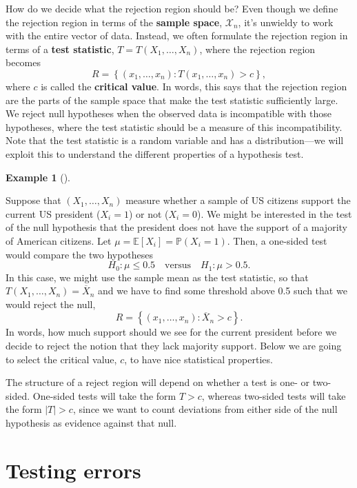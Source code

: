 \documentclass[
  letterpaper,
  DIV=11,
  numbers=noendperiod]{scrreprt}
\newcommand{\E}{\mathbb{E}}
\renewcommand{\P}{\mathbb{P}}
\newcommand{\Xbar}{\overline{X}}
\theoremstyle{definition}
\theoremstyle{plain}
\theoremstyle{definition}
\newtheorem{example}{Example}[chapter]
\theoremstyle{remark}
\begin{document}
How do we decide what the rejection region should be? Even though we
define the rejection region in terms of the \textbf{sample space},
\(\mathcal{X}_n\), it's unwieldy to work with the entire vector of data.
Instead, we often formulate the rejection region in terms of a
\textbf{test statistic}, \(T = T(X_1, \ldots, X_n)\), where the
rejection region becomes \[
R = \left\{(x_1, \ldots, x_n) : T(x_1, \ldots, x_n) > c\right\},
\] where \(c\) is called the \textbf{critical value}. In words, this
says that the rejection region are the parts of the sample space that
make the test statistic sufficiently large. We reject null hypotheses
when the observed data is incompatible with those hypotheses, where the
test statistic should be a measure of this incompatibility. Note that
the test statistic is a random variable and has a distribution---we will
exploit this to understand the different properties of a hypothesis
test.

\leavevmode{}%
\begin{example}[]\label{exm-biden}

Suppose that \((X_1, \ldots, X_n)\) measure whether a sample of US
citizens support the current US president (\(X_i = 1\)) or not
(\(X_i = 0\)). We might be interested in the test of the null hypothesis
that the president does not have the support of a majority of American
citizens. Let \(\mu = \E[X_i] = \P(X_i = 1)\). Then, a one-sided test
would compare the two hypotheses \[ 
H_0: \mu \leq 0.5 \quad\text{versus}\quad H_1: \mu > 0.5.
\] In this case, we might use the sample mean as the test statistic, so
that \(T(X_1, \ldots, X_n) = \Xbar_n\) and we have to find some
threshold above 0.5 such that we would reject the null, \[ 
R = \left\{(x_1, \ldots, x_n): \Xbar_n > c\right\}.
\] In words, how much support should we see for the current president
before we decide to reject the notion that they lack majority support.
Below we are going to select the critical value, \(c\), to have nice
statistical properties.

\end{example}

The structure of a reject region will depend on whether a test is one-
or two-sided. One-sided tests will take the form \(T > c\), whereas
two-sided tests will take the form \(|T| > c\), since we want to count
deviations from either side of the null hypothesis as evidence against
that null.

\hypertarget{testing-errors}{%
\section{Testing errors}\label{testing-errors}}
\end{document}
